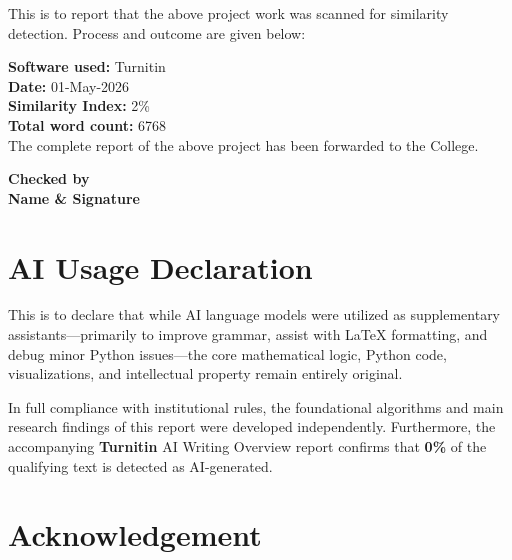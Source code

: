 \documentclass[12pt, a4paper]{report}
\begin{document}
\noindent This is to report that the above project work was scanned for similarity detection. Process and outcome are given below:

\vspace{0.5cm}
\noindent \textbf{Software used:} Turnitin\\[0.3cm]
\textbf{Date:} 01-May-2026\\[0.3cm]
\textbf{Similarity Index:} 2\%\\[0.3cm]
\textbf{Total word count:} 6768\\[0.5cm]

\noindent The complete report of the above project has been forwarded to the College.

\vspace{3cm}
\begin{flushright}
    \textbf{Checked by}\\
    \textbf{Name \& Signature}
\end{flushright}

\clearpage

\chapter*{AI Usage Declaration}

This is to declare that while AI language models were utilized as supplementary assistants—primarily to improve grammar, assist with LaTeX formatting, and debug minor Python issues—the core mathematical logic, Python code, visualizations, and intellectual property remain entirely original. 

In full compliance with institutional rules, the foundational algorithms and main research findings of this report were developed independently. Furthermore, the accompanying \textbf{Turnitin} AI Writing Overview report confirms that \textbf{0\%} of the qualifying text is detected as AI-generated.

\clearpage


\chapter*{Acknowledgement}
\end{document}
